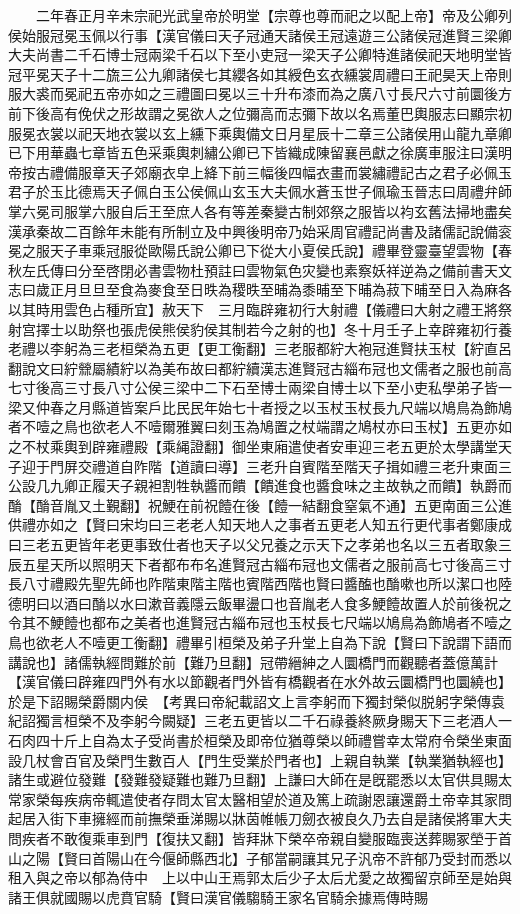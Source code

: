 　　二年春正月辛未宗祀光武皇帝於明堂【宗尊也尊而祀之以配上帝】帝及公卿列侯始服冠冕玉佩以行事【漢官儀曰天子冠通天諸侯王冠遠遊三公諸侯冠進賢三梁卿大夫尚書二千石博士冠兩梁千石以下至小吏冠一梁天子公卿特進諸侯祀天地明堂皆冠平冕天子十二旒三公九卿諸侯七其纓各如其綬色玄衣纁裳周禮曰王祀昊天上帝則服大裘而冕祀五帝亦如之三禮圖曰冕以三十升布漆而為之廣八寸長尺六寸前圜後方前下後高有俛伏之形故謂之冕欲人之位彌高而志彌下故以名焉董巴輿服志曰顯宗初服冕衣裳以祀天地衣裳以玄上纁下乘輿備文日月星辰十二章三公諸侯用山龍九章卿已下用華蟲七章皆五色采乘輿刺繡公卿已下皆織成陳留襄邑獻之徐廣車服注曰漢明帝按古禮備服章天子郊廟衣皁上絳下前三幅後四幅衣畫而裳繡禮記古之君子必佩玉君子於玉比德焉天子佩白玉公侯佩山玄玉大夫佩水蒼玉世子佩瑜玉晉志曰周禮弁師掌六冕司服掌六服自后王至庶人各有等差秦變古制郊祭之服皆以袀玄舊法掃地盡矣漢承秦故二百餘年未能有所制立及中興後明帝乃始采周官禮記尚書及諸儒記說備衮冕之服天子車乘冠服從歐陽氏說公卿已下從大小夏侯氏說】禮畢登靈臺望雲物【春秋左氏傳曰分至啓閉必書雲物杜預註曰雲物氣色灾變也素察妖祥逆為之備前書天文志曰歲正月旦旦至食為麥食至日昳為稷昳至晡為黍晡至下晡為菽下晡至日入為麻各以其時用雲色占種所宜】赦天下　三月臨辟雍初行大射禮【儀禮曰大射之禮王將祭射宫擇士以助祭也張虎侯熊侯豹侯其制若今之射的也】冬十月壬子上幸辟雍初行養老禮以李躬為三老桓榮為五更【更工衡翻】三老服都紵大袍冠進賢扶玉杖【紵直呂翻說文曰紵檾屬績紵以為美布故曰都紵續漢志進賢冠古緇布冠也文儒者之服也前高七寸後高三寸長八寸公侯三梁中二下石至博士兩梁自博士以下至小吏私學弟子皆一梁又仲春之月縣道皆案戶比民民年始七十者授之以玉杖玉杖長九尺端以鳩鳥為飾鳩者不噎之鳥也欲老人不噎爾雅翼曰刻玉為鳩置之杖端謂之鳩杖亦曰玉杖】五更亦如之不杖乘輿到辟雍禮殿【乘䋲證翻】御坐東廂遣使者安車迎三老五更於太學講堂天子迎于門屏交禮道自阼階【道讀曰導】三老升自賓階至階天子揖如禮三老升東面三公設几九卿正履天子親袒割牲執醬而饋【饋進食也醬食味之主故執之而饋】執爵而酳【酳音胤又土覲翻】祝鯁在前祝饐在後【饐一結翻食窒氣不通】五更南面三公進供禮亦如之【賢曰宋均曰三老老人知天地人之事者五更老人知五行更代事者鄭康成曰三老五更皆年老更事致仕者也天子以父兄養之示天下之孝弟也名以三五者取象三辰五星天所以照明天下者都布布名進賢冠古緇布冠也文儒者之服前高七寸後高三寸長八寸禮殿先聖先師也阼階東階主階也賓階西階也賢曰醬醢也酳嗽也所以潔口也陸德明曰以酒曰酳以水曰漱音義隱云飯畢盪口也音胤老人食多鯁饐故置人於前後祝之令其不鯁饐也都布之美者也進賢冠古緇布冠也玉杖長七尺端以鳩鳥為飾鳩者不噎之鳥也欲老人不噎更工衡翻】禮畢引桓榮及弟子升堂上自為下說【賢曰下說謂下語而講說也】諸儒執經問難於前【難乃旦翻】冠帶縉紳之人圜橋門而觀聽者蓋億萬計【漢官儀曰辟雍四門外有水以節觀者門外皆有橋觀者在水外故云圜橋門也圜繞也】於是下詔賜榮爵關内侯　【考異曰帝紀載詔文上言李躬而下獨封榮似脱躬字榮傳袁紀詔獨言桓榮不及李躬今闕疑】三老五更皆以二千石祿養終厥身賜天下三老酒人一石肉四十斤上自為太子受尚書於桓榮及即帝位猶尊榮以師禮嘗幸太常府令榮坐東面設几杖會百官及榮門生數百人【門生受業於門者也】上親自執業【執業猶執經也】諸生或避位發難【發難發疑難也難乃旦翻】上謙曰大師在是旣罷悉以太官供具賜太常家榮每疾病帝輒遣使者存問太官太醫相望於道及篤上疏謝恩讓還爵土帝幸其家問起居入街下車擁經而前撫榮垂涕賜以牀茵帷帳刀劒衣被良久乃去自是諸侯將軍大夫問疾者不敢復乘車到門【復扶又翻】皆拜牀下榮卒帝親自變服臨喪送葬賜冢塋于首山之陽【賢曰首陽山在今偃師縣西北】子郁當嗣讓其兄子汎帝不許郁乃受封而悉以租入與之帝以郁為侍中　上以中山王焉郭太后少子太后尤愛之故獨留京師至是始與諸王俱就國賜以虎賁官騎【賢曰漢官儀騶騎王家名官騎余據焉傳時賜